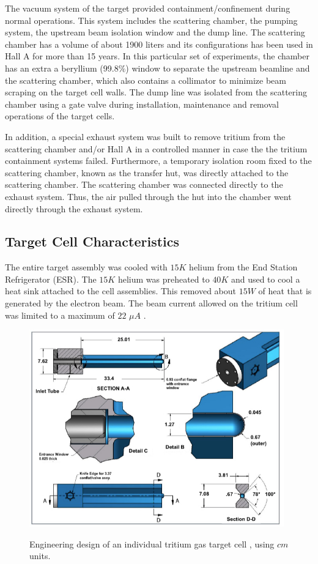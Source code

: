 \documentclass[final,5p,times,twocolumn]{elsarticle}
\begin{document}
The vacuum system of the target provided containment/confinement during normal operations. This system includes the scattering chamber, the pumping system, the upstream beam isolation window and the dump line.  The scattering chamber has a volume of about 1900 liters and its configurations has been used in Hall A for more than 15 years. In this particular set of experiments, the chamber has an extra a beryllium (99.8$\%$) window to separate the upstream beamline and the scattering chamber, which also contains a collimator to minimize beam scraping on the target cell walls. The dump line was isolated from the scattering chamber using a gate valve during installation, maintenance and removal operations of the target cells. 

In addition, a special exhaust system was built to remove tritium from the scattering chamber and/or Hall A in a controlled manner in case the the tritium containment systems failed.  Furthermore, a temporary isolation room fixed to the scattering chamber, known as the transfer hut, was directly attached to the scattering chamber. The scattering chamber was connected directly to the exhaust system. Thus, the air pulled through the hut into the chamber went directly through the exhaust system.  

\subsection{Target Cell Characteristics}

The entire target assembly was cooled with $15K$ helium from the End Station Refrigerator (ESR). The $15K$ helium was preheated to $40K$ and used to cool a heat sink attached to the cell assemblies. This removed about $15W$ of heat that is generated by the electron beam. The beam current allowed on the tritium cell was limited to a maximum of $22$ $\mu A$ \cite{engreport}.

\begin{figure}
\centering
  \includegraphics[width=11cm]{images/tritium_cell.jpg}\\
  \caption{Engineering design of an individual tritium gas target cell \cite{celldes}, using $cm$ units.
 }\label{cell}
\end{figure}
\end{document}
